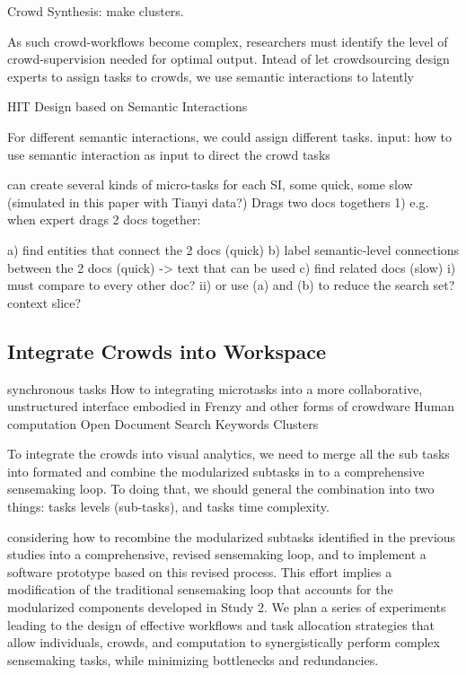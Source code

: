 \documentclass[journal]{vgtc}                %
\begin{document}
Crowd Synthesis: make clusters.

As such crowd-workflows become complex, researchers must identify the level of crowd-supervision needed for optimal output.
Intead of let crowdsourcing design experts to assign tasks to crowds, we use semantic interactions to latently

HIT Design based on Semantic Interactions

For different semantic interactions, we could assign different tasks.
input:  how to use semantic interaction as input to direct the crowd tasks

can create several kinds of micro-tasks for each SI, some quick, some slow  (simulated in this paper with Tianyi data?) \newline
Drags two docs togethers
1) e.g. when expert drags 2 docs together:

a) find entities that connect the 2 docs (quick)
b) label semantic-level connections between the 2 docs (quick) -> text that can be used
c) find related docs (slow)
i) must compare to every other doc?
ii) or use (a) and (b) to reduce the search set?  context slice?\newline

\subsection{Integrate Crowds into Workspace}

synchronous tasks
How to integrating microtasks into a more collaborative, unstructured interface embodied in Frenzy and other forms of crowdware
Human computation
Open Document
Search Keywords\newline
Clusters \newline

To integrate the crowds into visual analytics, we need to merge all the sub tasks into formated and combine the modularized subtasks in to a comprehensive sensemaking loop. To doing that, we should general the combination into two things: tasks levels (sub-tasks), and  tasks time complexity.

considering how to recombine the modularized subtasks identified in the previous studies into a comprehensive, revised sensemaking loop, and to implement a software prototype based on this revised process.
This effort implies a modification of the traditional sensemaking loop that accounts for the modularized components developed in Study 2.
We plan a series of experiments leading to the design of effective workflows and task allocation strategies that allow individuals, crowds, and computation to synergistically perform complex sensemaking tasks, while minimizing bottlenecks and redundancies.
\end{document}
